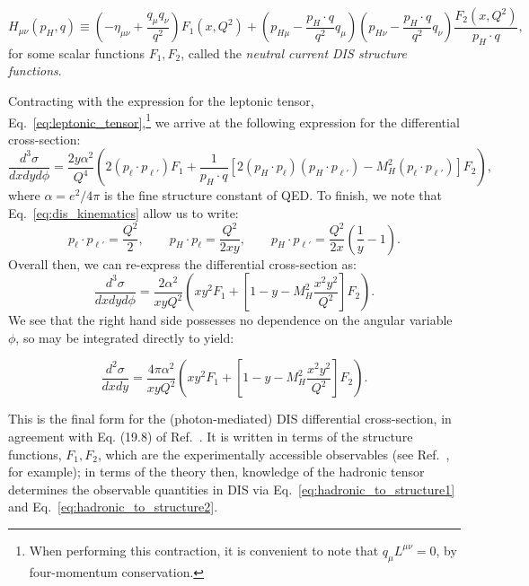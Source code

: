 \documentclass[withindex,glossary]{cam-thesis}
\begin{document}
\begin{equation}
H_{\mu\nu}(p_H, q) \equiv \left( -\eta_{\mu\nu} + \frac{q_{\mu} q_{\nu}}{q^2} \right) F_1(x,Q^2) + \left( p_{H\mu} - \frac{p_H \cdot q}{q^2} q_{\mu} \right) \left( p_{H\nu} - \frac{p_H \cdot q}{q^2} q_{\nu} \right) \frac{F_2(x,Q^2)}{p_H \cdot q},
\end{equation}
for some scalar functions $F_1, F_2$, called the \textit{neutral current DIS structure functions}.

Contracting with the expression for the leptonic tensor, Eq.~\eqref{eq:leptonic_tensor},\footnote{When performing this contraction, it is convenient to note that $q_{\mu} L^{\mu\nu} = 0$, by four-momentum conservation.} we arrive at the following expression for the differential cross-section:
\begin{equation}
\frac{d^3\sigma}{dx dy d\phi} = \frac{2y \alpha^2}{Q^4} \left( 2(p_{\ell} \cdot p_{\ell'}) F_1 + \frac{1}{p_H \cdot q} [2 (p_H \cdot p_{\ell}) (p_H \cdot p_{\ell'}) - M_H^2 (p_{\ell} \cdot p_{\ell'})] F_2 \right),
\end{equation}
where $\alpha = e^2 / 4\pi$ is the fine structure constant of QED. To finish, we note that Eq.~\eqref{eq:dis_kinematics} allow us to write:
\begin{equation}
p_{\ell} \cdot p_{\ell'} = \frac{Q^2}{2}, \qquad p_H \cdot p_{\ell} = \frac{Q^2}{2xy}, \qquad p_H \cdot p_{\ell'} = \frac{Q^2}{2x} \left( \frac{1}{y} - 1 \right). 
\end{equation}
Overall then, we can re-express the differential cross-section as:
\begin{equation}
\frac{d^3\sigma}{dx dy d\phi} = \frac{2\alpha^2}{xy Q^2} \left(xy^2F_1 + \left[1 - y - M_H^2 \frac{x^2y^2}{Q^2}\right] F_2\right).
\end{equation}
We see that the right hand side possesses no dependence on the angular variable $\phi$, so may be integrated directly to yield:
\begin{framed}
\begin{equation}
\frac{d^2\sigma}{dx dy} = \frac{4\pi\alpha^2}{xy Q^2} \left(xy^2F_1 + \left[1 - y - M_H^2 \frac{x^2y^2}{Q^2}\right] F_2 \right).
\end{equation}
\end{framed}
This is the final form for the (photon-mediated) DIS differential cross-section, in agreement with Eq. (19.8) of Ref.~\cite{ParticleDataGroup:2022pth}. It is written in terms of the structure functions, $F_1, F_2$, which are the experimentally accessible observables (see Ref.~\cite{}, for example); in terms of the theory then, knowledge of the hadronic tensor determines the observable quantities in DIS via Eq.~\eqref{eq:hadronic_to_structure1} and Eq.~\eqref{eq:hadronic_to_structure2}.
\end{document}
